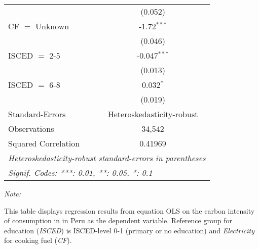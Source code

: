 \begin{table}[htbp!]
\begin{adjustbox}{width = 1\textwidth, max height = 0.95\textheight, center}
\begin{threeparttable}[b]
\begin{tabular}{lc}
                                & (0.052)\\   
            CF $=$ Unknown      & -1.72$^{***}$\\   
                                & (0.046)\\   
            ISCED $=$ 2-5       & -0.047$^{***}$\\   
                                & (0.013)\\   
            ISCED $=$ 6-8       & 0.032$^{*}$\\   
                                & (0.019)\\   
            \midrule 
            Standard-Errors     & Heteroskedasticity-robust \\   
            Observations        & 34,542\\  
            Squared Correlation & 0.41969\\  
            \midrule \midrule
            \multicolumn{2}{l}{\emph{Heteroskedasticity-robust standard-errors in parentheses}}\\
            \multicolumn{2}{l}{\emph{Signif. Codes: ***: 0.01, **: 0.05, *: 0.1}}\\
         \end{tabular}
         
         \begin{tablenotes}\item \medskip \textit{Note:}
            \item This table displays regression results from equation OLS on the carbon intensity of consumption in  in Peru as the dependent variable. Reference group for education (\textit{ISCED}) is ISCED-level 0-1 (primary or no education) and \textit{Electricity} for cooking fuel (\textit{CF}).
         \end{tablenotes}
      \end{threeparttable}
   \end{adjustbox}
\end{table}


